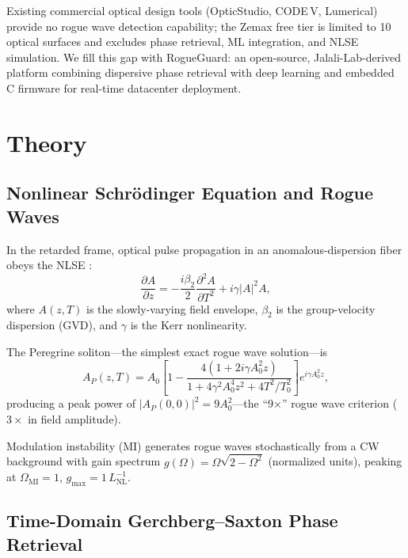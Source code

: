 \documentclass[10pt,twocolumn]{article}
\begin{document}
Existing commercial optical design tools (OpticStudio, CODE\,V, Lumerical)
provide no rogue wave detection capability; the Zemax free tier is limited
to 10 optical surfaces and excludes phase retrieval, ML integration, and
NLSE simulation.
We fill this gap with RogueGuard: an open-source, Jalali-Lab-derived
platform combining dispersive phase retrieval \cite{Chou2007} with
deep learning and embedded C firmware for real-time datacenter deployment.

\section{Theory}
\label{sec:theory}

\subsection{Nonlinear Schr\"{o}dinger Equation and Rogue Waves}

In the retarded frame, optical pulse propagation in an anomalous-dispersion
fiber obeys the NLSE \cite{Agrawal2019}:
\begin{equation}
  \frac{\partial A}{\partial z}
  = -\frac{i\beta_2}{2}\frac{\partial^2 A}{\partial T^2}
    + i\gamma|A|^2 A,
  \label{eq:nlse}
\end{equation}
where $A(z,T)$ is the slowly-varying field envelope, $\beta_2$ is the
group-velocity dispersion (GVD), and $\gamma$ is the Kerr nonlinearity.

The Peregrine soliton---the simplest exact rogue wave solution---is
\begin{equation}
  A_P(z,T) = A_0\!\left[1 - \frac{4(1+2i\gamma A_0^2 z)}
    {1 + 4\gamma^2 A_0^4 z^2 + 4T^2/T_0^2}\right]e^{i\gamma A_0^2 z},
\end{equation}
producing a peak power of $|A_P(0,0)|^2 = 9A_0^2$---the
``9$\times$'' rogue wave criterion ($3\times$ in field amplitude).

Modulation instability (MI) generates rogue waves stochastically from a CW
background with gain spectrum
$g(\Omega) = \Omega\sqrt{2 - \Omega^2}$ (normalized units),
peaking at $\Omega_\text{MI} = 1$, $g_\text{max} = 1\,L_\text{NL}^{-1}$.

\subsection{Time-Domain Gerchberg--Saxton Phase Retrieval}
\end{document}
